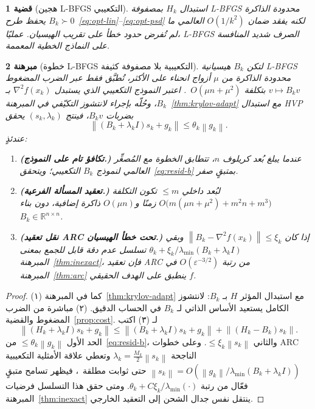\documentclass[11pt,a4paper]{article}
\theoremstyle{plain}
\newtheorem{theorem}{مبرهنة}[section]
\newtheorem{proposition}[theorem]{قضية}
\theoremstyle{definition}
\newcommand{\R}{\mathbb{R}}
\newcommand{\norm}[1]{\left\|#1\right\|}
\newcommand{\hess}{\nabla^{2}}
\begin{document}
\begin{proposition}[هجين L-BFGS التكعيبي]
\label{prop:lbfgs}
استبدال $H_{k}$ بمصفوفة L-BFGS محدودة الذاكرة $B_{k}\succ 0$ يحفظ طرح~\eqref{eq:opt-lin}--\eqref{eq:opt-psd} لكنه يفقد ضمان $O(1/k^{2})$ العالمي ما لم تُفرض حدود خطأ على تقريب الهيسيان.
عمليًا، L-BFGS الصرف شديد المنافسة على النماذج الخطية المعممة.
\end{proposition}

\begin{theorem}[خطوة L-BFGS التكعيبية بلا مصفوفة كثيفة]
\label{thm:mf-qn}
لتكن $B_{k}$ هيسيانية L-BFGS محدودة الذاكرة من $\mu$ أزواج انحناء على الأكثر، تُطبَّق فقط عبر الضرب المضغوط $v\mapsto B_{k}v$ بتكلفة $O(\mu n+\mu^{2})$~\cite{byrd1994representationsations}.
اعتبر النموذج التكعيبي الذي يستبدل $\hess f(x_{k})$ بـ $B_{k}$، وحُلّه بإجراء لانتشوز التكيّفي في المبرهنة~\ref{thm:krylov-adapt} مع استبدال HVP بضربات $B_{k}v$، فينتج $(s_{k},\lambda_{k})$ يحقق
\begin{equation}
\label{eq:resid-b}
\norm{(B_{k}+\lambda_{k}I)s_{k}+g_{k}}
\le
\theta_{k}\norm{g_{k}}.
\end{equation}
عندئذٍ:
\begin{enumerate}[leftmargin=*,itemsep=1pt]
  \item \textbf{(تكافؤ تام على النموذج.)}
  عندما يبلغ بُعد كريلوف $n$، تتطابق الخطوة مع المُصغِّر العالمي لنموذج $B_{k}$ التكعيبي؛ ويتحقق~\eqref{eq:resid-b} بمتبقٍ صفر.
  \item \textbf{(تعقيد المسألة الفرعية.)}
  لبُعد داخلي $\le m$ تكون التكلفة
  $O\bigl(m(\mu n+\mu^{2})+m^{2}n+m^{3}\bigr)$ زمنًا و$O(\mu n)$ ذاكرة إضافية، دون بناء $B_{k}\in\R^{n\times n}$.
  \item \textbf{(نقل تعقيد ARC تحت خطأ الهيسيان.)}
  إذا كان $\norm{B_{k}-\hess f(x_{k})}\le\xi_{k}$ وبقي $\theta_{k}+\xi_{k}/\lambda_{\min}(B_{k}+\lambda_{k}I)$ تسلسل عدم دقة قابل للجمع بمعنى المبرهنة~\ref{thm:inexact}، فإن تعقيد ARC من رتبة $O(\varepsilon^{-3/2})$ في المبرهنة~\ref{thm:arc} ينطبق على الهدف الحقيقي $f$.
\end{enumerate}
\end{theorem}

\begin{proof}
(١) كما في المبرهنة~\ref{thm:krylov-adapt} مع استبدال المؤثر $H$ بـ $B_{k}$: لانتشوز الكامل يستعيد الأساس الذاتي لـ $B_{k}$ في الحساب الدقيق.
(٢) مباشرة من الضرب المضغوط والقضية~\ref{prop:cost}.
لـ (٣) اكتب
\[
\norm{(H_{k}+\lambda_{k}I)s_{k}+g_{k}}
\le
\norm{(B_{k}+\lambda_{k}I)s_{k}+g_{k}}
+
\norm{(H_{k}-B_{k})s_{k}}.
\]
الحد الأول $\le\theta_{k}\norm{g_{k}}$ من~\eqref{eq:resid-b}، والثاني $\le\xi_{k}\norm{s_{k}}$.
وعلى خطوات ARC الناجحة $\lambda_{k}=\tfrac{M_{k}}{2}\norm{s_{k}}$ وتعطي علاقة الأمثلية التكعيبية $\norm{s_{k}}=O(\norm{g_{k}}/\lambda_{\min}(B_{k}+\lambda_{k}I))$ حتى ثوابت مطلقة~\cite{cartis2011arc}، فيظهر تسامح متبقٍ فعّال من رتبة $\theta_{k}+C\xi_{k}/\lambda_{\min}(\cdot)$.
ومتى حقق هذا التسلسل فرضيات المبرهنة~\ref{thm:inexact} ينتقل نفس جدال الشحن إلى التعقيد الخارجي.
\end{proof}
\end{document}
